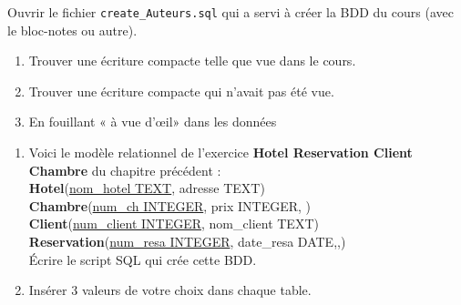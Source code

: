 \documentclass[10pt,cours,a4paper,firamath]{nsi}
\begin{document}
\begin{exercice}[]
    Ouvrir le fichier \texttt{create\_Auteurs.sql} qui a servi à créer la BDD du cours (avec le bloc-notes ou autre).
    \begin{enumerate}
        \item 	Trouver une écriture compacte telle que vue dans le cours.
        \item 	Trouver une écriture compacte qui n'avait pas été vue.
        \item 	En fouillant « à vue d'\oe il» dans les données
    \end{enumerate}
\end{exercice}
\begin{exercice}[]
    \begin{enumerate}
        \item Voici le modèle relationnel de l'exercice \textbf{Hotel Reservation Client Chambre} du chapitre précédent :\\
              
              \textbf{Hotel}(\uline{nom\_hotel TEXT}, adresse TEXT)\\
              
              \textbf{Chambre}(\uline{num\_ch INTEGER}, prix INTEGER, )\\
              
              \textbf{Client}(\uline{num\_client INTEGER}, nom\_client TEXT)\\
              
              
              \textbf{Reservation}(\uline{num\_resa INTEGER}, date\_resa DATE,,)\\
              
              Écrire le script SQL qui crée cette BDD.
        \item Insérer 3 valeurs de votre choix dans chaque table.
    \end{enumerate}
\end{exercice}
\end{document}

